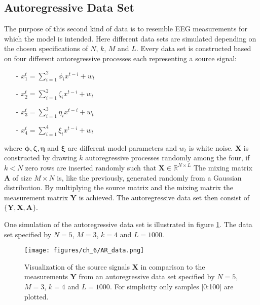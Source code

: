 \subsection{Autoregressive Data Set}
The purpose of this second kind of data is to resemble EEG measurements for which the model is intended. Here different data sets are simulated depending on the chosen specifications of $N$, $k$, $M$ and $L$. 
Every data set is constructed based on four different autoregressive processes each representing a source signal:
\begin{itemize}
\item[-] $x_{1}^{t} = \sum_{i=1}^{2} \phi_i x^{t-i} + w_t$
\item[-] $x_{2}^{t} = \sum_{i=1}^{2} \zeta_i x^{t-i} + w_t$
\item[-] $x_{3}^{t} = \sum_{i=1}^{3} \eta_i x^{t-i} + w_t$
\item[-] $x_{4}^{t} = \sum_{i=1}^{4} \xi_i x^{t-i} + w_t$
\end{itemize}
where $\boldsymbol{\phi}, \boldsymbol{\zeta}, \boldsymbol{\eta}$ and $\boldsymbol{\xi}$ are different model parameters and $w_t$ is white noise.
$\mathbf{X}$ is constructed by drawing $k$ autoregressive processes randomly among the four, if $k < N$ zero rows are inserted randomly such that $\mathbf{X} \in \mathbb{R}^{N \times L}$  
The mixing matrix $\mathbf{A}$ of size $M \times N$ is, like the previously, generated randomly from a Gaussian distribution.
By multiplying the source matrix and the mixing matrix the measurement matrix $\mathbf{Y}$ is achieved.
The autoregressive data set then consist of $\{ \mathbf{Y}, \mathbf{X}, \mathbf{A} \}$. 

One simulation of the autoregressive data set is illustrated in figure \ref{fig:AR}. The data set specified by $N = 5$, $M = 3$, $k = 4$ and $L = 1000$.
\begin{figure}[H]
\centering
\texttt{[image: figures/ch\_6/AR\_data.png]}
\caption{Visualization of the source signals $\mathbf{X}$ in comparison to the measurements $\mathbf{Y}$ from an autoregressive data set specified by $N = 5$, $M = 3$, $k = 4$ and $L=1000$. For simplicity only samples [0:100] are plotted.}
\label{fig:AR}
\end{figure}
\noindent

